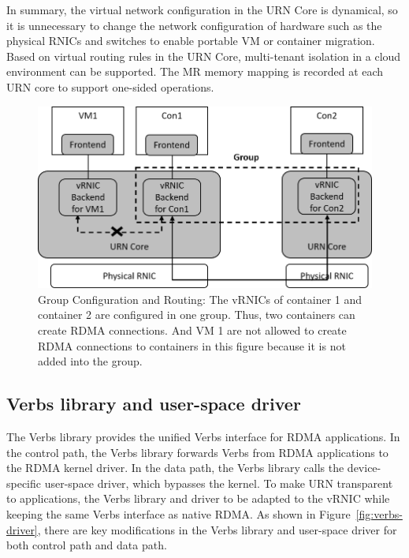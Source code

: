 In summary, the virtual network configuration in the URN Core is dynamical, so it is unnecessary to change the network configuration of hardware such as the physical RNICs and switches to enable portable VM or container migration. Based on virtual routing rules in the URN Core, multi-tenant isolation in a cloud environment can be supported. The MR memory mapping is recorded at each URN core to support one-sided operations.

\begin{figure}[!ht]
	\centering
	\includegraphics[width=1.0\linewidth]{images/route-config}
	\caption{Group Configuration and Routing: The vRNICs of container 1 and container 2 are configured in one group. Thus, two containers can create RDMA connections. And VM 1 are not allowed to create RDMA connections to containers in this figure because it is not added into the group. }
	\label{fig:route-config}
\end{figure}

\subsection{Verbs library and user-space driver}

The Verbs library provides the unified Verbs interface for RDMA applications. In the control path, the Verbs library forwards Verbs from RDMA applications to the RDMA kernel driver. In the data path, the Verbs library calls the device-specific user-space driver, which bypasses the kernel. To make URN transparent to applications, the Verbs library and driver to be adapted to the vRNIC while keeping the same Verbs interface as native RDMA. As shown in Figure~\ref{fig:verbs-driver}, there are key modifications in the Verbs library and user-space driver for both control path and data path.


